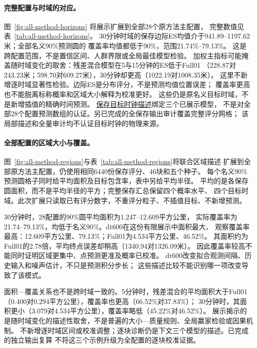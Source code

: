 \paragraph{完整配置与时域的对应。}
图~\ref{fig:all-method-horizons} 将展示扩展到全部28个原方法主配置，
完整数值见表~\ref{tab:all-method-horizons}。
30分钟时域的保存边际ES均值介于941.89--1197.62米；全部名义90\%预测圆的
覆盖率均值都低于90\%，范围21.74\%--79.13\%。
这是跨配置范围，不是置信区间、人群界限或全局最佳模型检验。
加权主指标可能掩盖随时域变化的取舍：残差混合模型在5与15分钟的ES低于Full01
（228.87对243.23米；598.70对609.27米），30分钟却更高（1022.19对1008.35米）。
这里不新增逐时域显著性检验。边际ES是分布评分，不是预测均值位置误差；
覆盖率更高也不能脱离标称概率和区域大小解释为校准更好。
这些仍是原名义目标时域，不是新增插值的精确时间预测。
\hyperref[sec:target-times]{保存目标时钟描述}绑定三个已展示模型，
不是对全部28个配置预测数组的认证。另已完成的全保存输出审计覆盖完整评分网格；
该局部描述和全量审计均不认证目标时钟的物理来源。


\FloatBarrier
\paragraph{全部配置的区域大小与覆盖。}
图~\ref{fig:all-method-regions}与表~\ref{tab:all-method-regions}将联合区域描述
扩展到全部原方法主配置，仍使用相同6440份保存评分、46块和五个种子。
每个名义90\%预测圆格子同时给平均面积及目标包含率，表中另给平均半径。
平均的是各保存圆面积，而不是平均半径的平方；完整保存汇总保留四个概率水平、
四个目标时域。此次扩展只读取已有评分数字，不重评分粒子、不插值目标、不新增预测。

30分钟时，28配置的90\%圆平均面积为1.247--12.609平方公里，
实际覆盖率为21.74--79.13\%，均低于名义90\%。dt600在这份有限展示中面积最大、
观察覆盖率最高：12.609平方公里、79.13\%；Full01为4.534平方公里、46.52\%。
其面积约为Full01的2.78倍，平均终点误差却稍高（1340.94对1326.09米）。
因此覆盖率较高不能同时证明区域更集中、点预测更准及概率已校准。
dt600改变拟合观测间隔、历史输入和噪声估计，不只是预测积分步长；
这些描述比较不能识别哪一项改变导致了该模式。

面积—覆盖关系也不是跨时域一致的。5分钟时，残差混合的平均面积大于Full01
（0.400对0.294平方公里），覆盖率也更高（66.52\%对37.83\%）；
30分钟时，其面积更小（3.079对4.534平方公里），覆盖率略低（45.22\%对46.52\%）。
展示揭示的是随时域变化的描述性取舍，不是普遍的大小—质量规则、全局赢家检验或因果机制。
不新增逐时域区间或校准调整；逐块诊断仍是下文三个模型的描述。已完成的独立输出复算
不将这三个示例升级为全配置的逐块校准证据。

\FloatBarrier

